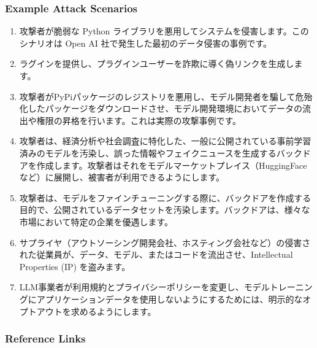 \documentclass[
]{article}
\providecommand{\tightlist}{%
  \setlength{\itemsep}{0pt}\setlength{\parskip}{0pt}}
\begin{document}
\subsubsection{Example Attack Scenarios}\label{example-attack-scenarios}

\begin{enumerate}
\def\labelenumi{\arabic{enumi}.}
\tightlist
\item
  攻撃者が脆弱な Python
  ライブラリを悪用してシステムを侵害します。このシナリオは Open AI
  社で発生した最初のデータ侵害の事例です。
\item
  ラグインを提供し、プラグインユーザーを詐欺に導く偽リンクを生成します。
\item
  攻撃者がPyPiパッケージのレジストリを悪用し、モデル開発者を騙して危殆化したパッケージをダウンロードさせ、モデル開発環境においてデータの流出や権限の昇格を行います。これは実際の攻撃事例です。
\item
  攻撃者は、経済分析や社会調査に特化した、一般に公開されている事前学習済みのモデルを汚染し、誤った情報やフェイクニュースを生成するバックドアを作成します。攻撃者はそれをモデルマーケットプレイス（HuggingFaceなど）に展開し、被害者が利用できるようにします。
\item
  攻撃者は、モデルをファインチューニングする際に、バックドアを作成する目的で、公開されているデータセットを汚染します。バックドアは、様々な市場において特定の企業を優遇します。
\item
  サプライヤ（アウトソーシング開発会社、ホスティング会社など）の侵害された従業員が、データ、モデル、またはコードを流出させ、Intellectual
  Properties (IP) を盗みます。
\item
  LLM事業者が利用規約とプライバシーポリシーを変更し、モデルトレーニングにアプリケーションデータを使用しないようにするためには、明示的なオプトアウトを求めるようにします。
\end{enumerate}

\subsubsection{Reference Links}\label{reference-links}
\end{document}
